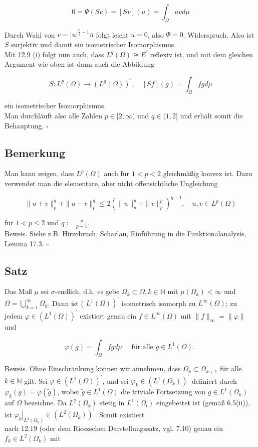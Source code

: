 \documentclass[10pt, letterpaper]{article}
\begin{document}
$$
0=\Psi(S v)=[S v](u)=\int_{\Omega} u v d \mu
$$

Durch Wahl von $v=|u|^{\frac{p}{q}-1} \bar{u}$ folgt leicht $u=0$, also $\Psi=0$. Widerspruch. Also ist $S$ surjektiv und damit ein isometrischer Isomorphismus.\\
Mit 12.9 (i) folgt nun auch, dass $L^{q}(\Omega) \cong E^{\prime}$ reflexiv ist, und mit dem gleichen Argument wie oben ist dann auch die Abbildung

$$
S: L^{p}(\Omega) \rightarrow\left(L^{q}(\Omega)\right)^{\prime}, \quad[S f](g)=\int_{\Omega} f g d \mu
$$

ein isometrischer Isomorphismus.\\
Man durchläuft also alle Zahlen $p \in[2, \infty)$ und $q \in(1,2]$ und erhält somit die Behauptung. \(\square\)

\subsection*{Bemerkung}
Man kann zeigen, dass $L^{p}(\Omega)$ auch für $1<p<2$ gleichmäßig konvex ist. Dazu verwendet man die elementare, aber nicht offensichtliche Ungleichung

$$
\|u+v\|_{p}^{q}+\|u-v\|_{p}^{q} \leq 2\left(\|u\|_{p}^{p}+\|v\|_{p}^{p}\right)^{q-1}, \quad u, v \in L^{p}(\Omega)
$$

für $1<p \leq 2$ und $q:=\frac{p}{p-1}$.\\
Beweis. Siehe z.B. Hirzebruch, Scharlau, Einführung in die Funktionalanalysis, Lemma 17.3. \(\square\)

\subsection*{Satz}
Das Maß $\mu$ sei $\sigma$-endlich, d.h. es gebe $\Omega_{k} \subset \Omega, k \in \mathbb{N}$ mit $\mu\left(\Omega_{k}\right)<\infty$ und $\Omega=\bigcup_{k=1}^{\infty} \Omega_{k}$. Dann ist ( $\left.L^{1}(\Omega)\right)^{\prime}$ isometrisch isomorph zu $L^{\infty}(\Omega)$; zu jedem $\varphi \in\left(L^{1}(\Omega)\right)^{\prime}$ existiert genau ein $f \in L^{\infty}(\Omega)$ mit $\|f\|_{\infty}=\|\varphi\|$ und

$$
\varphi(g)=\int_{\Omega} f g d \mu \quad \text { für alle } g \in L^{1}(\Omega) \text {. }
$$

Beweis. Ohne Einschränkung können wir annehmen, dass $\Omega_{k} \subset \Omega_{k+1}$ für alle $k \in \mathbb{N}$ gilt. Sei $\varphi \in\left(L^{1}(\Omega)\right)^{\prime}$, und sei $\varphi_{k} \in\left(L^{1}\left(\Omega_{k}\right)\right)^{\prime}$ definiert durch $\varphi_{k}(g)=\varphi(\tilde{g})$, wobei $\tilde{g} \in L^{1}(\Omega)$ die triviale Fortsetzung von $g \in L^{1}\left(\Omega_{k}\right)$ auf $\Omega$ bezeichne. Da $L^{2}\left(\Omega_{k}\right)$ stetig in $L^{1}\left(\Omega_{l}\right)$ eingebettet ist (gemäß 6.5(ii)), ist $\left.\varphi_{k}\right|_{L^{2}\left(\Omega_{k}\right)} \in\left(L^{2}\left(\Omega_{k}\right)\right)^{\prime}$. Somit existiert\\
nach 12.19 (oder dem Rieszschen Darstellungssatz, vgl. 7.10) genau ein $f_{k} \in L^{2}\left(\Omega_{k}\right)$ mit
\end{document}
